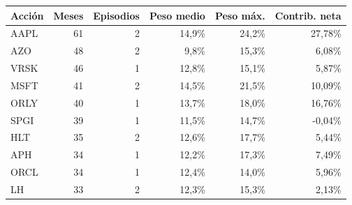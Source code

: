 \begin{tabular}{lrrrrr}
\toprule
Acción & Meses & Episodios & Peso medio & Peso máx. & Contrib. neta \\
\midrule
AAPL & 61 & 2 & 14,9\% & 24,2\% & 27,78\% \\
AZO & 48 & 2 & 9,8\% & 15,3\% & 6,08\% \\
VRSK & 46 & 1 & 12,8\% & 15,1\% & 5,87\% \\
MSFT & 41 & 2 & 14,5\% & 21,5\% & 10,09\% \\
ORLY & 40 & 1 & 13,7\% & 18,0\% & 16,76\% \\
SPGI & 39 & 1 & 11,5\% & 14,7\% & -0,04\% \\
HLT & 35 & 2 & 12,6\% & 17,7\% & 5,44\% \\
APH & 34 & 1 & 12,2\% & 17,3\% & 7,49\% \\
ORCL & 34 & 1 & 12,4\% & 14,0\% & 5,96\% \\
LH & 33 & 2 & 12,3\% & 15,3\% & 2,13\% \\
\bottomrule
\end{tabular}
